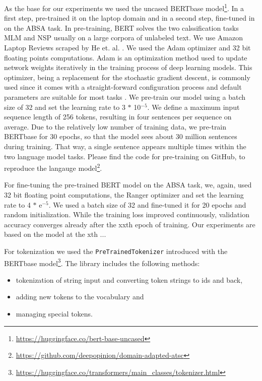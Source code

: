 As the base for our experiments we used the uncased BERTbase model\footnote{\url{https://huggingface.co/bert-base-uncased}}\cite{DBLP:journals/corr/abs-1810-04805}. In a first step, pre-trained it on the laptop domain and in a second step, fine-tuned in on the ABSA task. In pre-training, BERT solves the two calssification tasks MLM and NSP usually on a large corpora of unlabeled text. We use Amazon Laptop Reviews scraped by He et. al. \cite{he2016ups}. We used the Adam optimizer and 32 bit floating points computations. Adam is an optimization method used to update network weights iteratively in the training process of deep learning models. This optimizer, being a replacement for the stochastic gradient descent, is commonly used since it comes with a straight-forward configuration process and default parameters are suitable for most tasks \cite{kingma2014adam}. We pre-train our model using a batch size of 32 and set the learning rate to 3 $*$ 10$^{-5}$.
We define a maximum input sequence length of 256 tokens, resulting in four sentences per sequence on average.  Due to the relatively low number of training data, we pre-train BERTbase for 30 epochs, so that the model sees about 30 million sentences during training. That way, a single sentence appears multiple times within the two language model tasks. Please find the code for pre-training on GitHub, to reproduce the langauge model\footnote{\url{https://github.com/deepopinion/domain-adapted-atsc}}.

For fine-tuning the pre-trained BERT model on the ABSA task, we, again, used 32 bit floating point computations, the Ranger optimizer and set the learning rate to 4 $*$ e$^{-5}$. We used a batch size of 32 and fine-tuned it for 20 epochs and random initialization. While the training loss improved continuously, validation accuracy converges already after the xxth epoch of training. Our experiments are based on the model at the xth ... 


For tokenization we used the \texttt{PreTrainedTokenizer} introduced with the BERTbase model\footnote{\url{https://huggingface.co/transformers/main_classes/tokenizer.html}}. The library includes the following methods:
\begin{itemize}
\item tokenization of string input and converting token strings to ids and back,
\item adding new tokens to the vocabulary and
\item managing special tokens.
\end{itemize}



